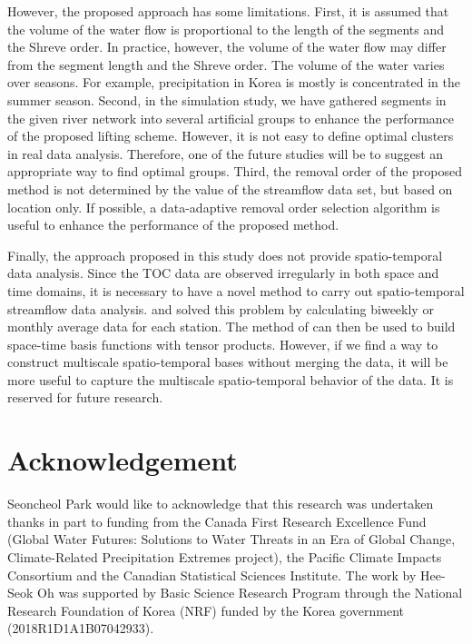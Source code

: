 \documentclass[11pt,titlepage]{article}
\begin{document}
However, the proposed approach has some limitations. First, it is assumed that the volume of the water flow is proportional to the length of the segments and the Shreve order. In practice, however, the volume of the water flow may differ from the segment length and the Shreve order. The volume of the water varies over seasons. For example, precipitation in Korea is mostly is concentrated in the summer season. Second, in the simulation study, we have gathered segments in the given river network into several artificial groups to enhance the performance of the proposed lifting scheme. However, it is not easy to define optimal clusters in real data analysis. Therefore, one of the future studies will be to suggest an appropriate way to find optimal groups. Third, the removal order of the proposed method is not determined by the value of the streamflow data set, but based on location only. If possible, a data-adaptive removal order selection algorithm is useful to enhance the performance of the proposed method. %

Finally, the approach proposed in this study does not provide spatio-temporal data analysis. Since the TOC data are observed irregularly in both space and time domains, it is necessary to have a novel method to carry out spatio-temporal streamflow data analysis. \cite{Lindstrom2014} and \cite{ODonnell2014} solved this problem by calculating biweekly or monthly average data for each station. The method of \cite{ODonnell2014} can then be used to build space-time basis functions with tensor products. However, if we find a way to construct multiscale spatio-temporal bases without merging the data, it will be more useful to capture the multiscale spatio-temporal behavior of the data. It is reserved for future research.


\section*{Acknowledgement}
Seoncheol Park would like to acknowledge that this research was undertaken thanks in part to funding from the Canada First Research Excellence Fund (Global Water Futures: Solutions to Water Threats in an Era of Global Change, Climate-Related Precipitation Extremes project), the Pacific Climate Impacts Consortium and the Canadian Statistical Sciences Institute. The work by Hee-Seok Oh was supported by Basic Science Research Program through the National Research Foundation of Korea (NRF) funded by the Korea government (2018R1D1A1B07042933). 
\end{document}
